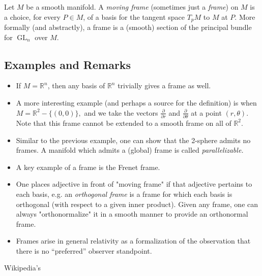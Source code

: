 \documentclass[12pt]{article}
\begin{document}
Let $M$ be a smooth manifold.  A \emph{moving frame} (sometimes just a \emph{frame}) on $M$ is a choice, for every $P\in M$, of a basis for the tangent space $T_pM$ to $M$ at $P$.  More formally (and abstractly), a frame is a (smooth) section of the principal bundle for $\operatorname{GL}_n$ over $M$.

\subsection*{Examples and Remarks}
\begin{itemize}
\item If $M=\mathbb{R}^n$, then any basis of $\mathbb{R}^n$ trivially gives a frame as well.
\item A more interesting example (and perhaps a source for the definition) is when $M=\mathbb{R}^2-\{(0,0)\},$ and we take the vectors $\frac{\partial}{\partial r}$ and $\frac{\partial}{\partial\theta}$ at a point $(r,\theta)$.  Note that this frame cannot be extended to a smooth frame on all of $\mathbb{R}^2$.
\item Similar to the previous example, one can show that the 2-sphere admits no frames.  A manifold which admits a (global) frame is called \emph{parallelizable.}
\item A key example of a frame is the Frenet frame.
\item One places adjective in front of "moving frame" if that adjective pertains to each basis, e.g. an \emph{orthogonal frame} is a frame for which each basis is orthogonal (with respect to a given inner product).  Given any frame, one can always "orthonormalize" it in a smooth manner to provide an orthonormal frame.
\item Frames arise in general relativity as a formalization of the observation that there is no ``preferred'' observer standpoint.
\end{itemize}

\begin{thebibliography}{9}
 Wikipedia's 
\end{thebibliography}
\end{document}

